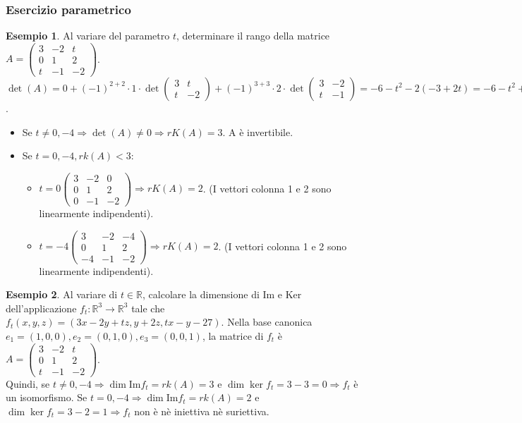 \documentclass[a4paper]{article}
\theoremstyle{definition}
\newtheorem*{es}{Esempio}
\begin{document}
\subsubsection{Esercizio parametrico}
\begin{es}
	Al variare del parametro $t$, determinare il rango della matrice $A = \begin{pmatrix}
			3 & -2 & t  \\
			0 & 1  & 2  \\
			t & -1 & -2
		\end{pmatrix}$.
	$\det(A) = 0 + (-1)^{2 + 2} \cdot 1 \cdot \det \begin{pmatrix}
			3 & t  \\
			t & -2
		\end{pmatrix} + (-1)^{3 + 3} \cdot 2 \cdot \det \begin{pmatrix}
			3 & -2 \\
			t & -1
		\end{pmatrix} = -6 - t^2 - 2(-3 + 2t) = -6 - t^2 + 6 - 4t = -t^2 - 4t = -t(t + 4)$.
	\begin{itemize}
		\item Se $t \ne 0, -4 \Rightarrow \det(A) \ne 0 \Rightarrow rK(A) = 3$. A è invertibile.
		\item Se $t = 0, -4, rk(A) < 3$:
		      \begin{itemize}
			      \item $t = 0 \begin{pmatrix}
					            3 & -2 & 0  \\
					            0 & 1  & 2  \\
					            0 & -1 & -2
				            \end{pmatrix} \Rightarrow rK(A) = 2$. (I vettori colonna 1 e 2 sono linearmente indipendenti).
			      \item $t = -4 \begin{pmatrix}
					            3  & -2 & -4 \\
					            0  & 1  & 2  \\
					            -4 & -1 & -2
				            \end{pmatrix} \Rightarrow rK(A) = 2$. (I vettori colonna 1 e 2 sono linearmente indipendenti).
		      \end{itemize}
	\end{itemize}
\end{es}
\begin{es}
	Al variare di $t \in \mathbb{R}$, calcolare la dimensione di Im e Ker dell'applicazione $f_t: \mathbb{R}^3 \rightarrow \mathbb{R}^3$ tale che $f_t(x, y, z) = (3x-2y+tz, y+2z, tx-y-27)$.
	Nella base canonica $e_1 = (1, 0, 0), e_2 = (0, 1, 0), e_3 = (0, 0, 1)$, la matrice di $f_t$ è $A = \begin{pmatrix}
			3 & -2 & t  \\
			0 & 1  & 2  \\
			t & -1 & -2
		\end{pmatrix}$. \\
	Quindi, se $t \ne 0, -4 \Rightarrow \dim \text{Im} f_t = rk(A) = 3$ e $\dim \ker f_t = 3 - 3 = 0 \Rightarrow f_t$ è un isomorfismo.
	Se $t = 0, -4 \Rightarrow \dim \text{Im} f_t = rk(A) = 2$ e $\dim \ker f_t = 3 - 2 = 1 \Rightarrow f_t$ non è nè iniettiva nè suriettiva.
\end{es}
\end{document}
